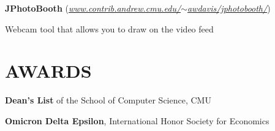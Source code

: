 \documentclass[margin, 11pt]{res} %
\begin{document}
\begin{resume}
\vspace{3pt}
{\bf JPhotoBooth} (\href{www.contrib.andrew.cmu.edu/~awdavis/jphotobooth/}{\sl www.contrib.andrew.cmu.edu/$\sim$awdavis/jphotobooth/})
\begin{itemize} \itemsep -2pt
{\small \item Webcam tool that allows you to draw on the video feed}
\end{itemize}



\section{AWARDS} 

{\bf Dean's List} of the School of Computer Science, CMU

\vspace{3pt}

{\bf Omicron Delta Epsilon}, International Honor Society for Economics


\end{resume}
\end{document}
